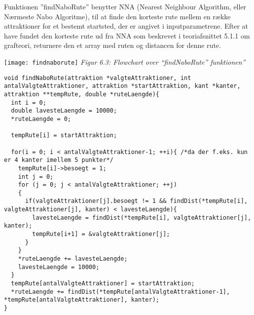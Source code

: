 Funktionen ”findNaboRute” benytter NNA (Nearest Neighbour Algorithm, eller Nærmeste Nabo Algoritme), til at finde den korteste rute mellem en række attraktioner for et bestemt startsted, der er angivet i inputparametrene. Efter at have fundet den korteste rute ud fra NNA som beskrevet i teoriafsnittet 5.1.1 om grafteori, returnere den et array med ruten og distancen for denne rute. \newline
\begin{flushleft}
	\texttt{[image: findnaborute]}\newline
	\textit{Figur 6.3: Flowchart over “findNaboRute” funktionen”}
\end{flushleft}
\begin{lstlisting}
void findNaboRute(attraktion *valgteAttraktioner, int antalValgteAttraktioner, attraktion *startAttraktion, kant *kanter, attraktion **tempRute, double *ruteLaengde){
  int i = 0;
  double lavesteLaengde = 10000;
  *ruteLaengde = 0;

  tempRute[i] = startAttraktion;

  for(i = 0; i < antalValgteAttraktioner-1; ++i){ /*da der f.eks. kun er 4 kanter imellem 5 punkter*/
    tempRute[i]->besoegt = 1;
    int j = 0;
    for (j = 0; j < antalValgteAttraktioner; ++j)
    {
      if(valgteAttraktioner[j].besoegt != 1 && findDist(*tempRute[i], valgteAttraktioner[j], kanter) < lavesteLaengde){
        lavesteLaengde = findDist(*tempRute[i], valgteAttraktioner[j], kanter);
        tempRute[i+1] = &valgteAttraktioner[j];
      }
    }
    *ruteLaengde += lavesteLaengde;
    lavesteLaengde = 10000;
  }
  tempRute[antalValgteAttraktioner] = startAttraktion;
  *ruteLaengde += findDist(*tempRute[antalValgteAttraktioner-1], *tempRute[antalValgteAttraktioner], kanter);
}
\end{lstlisting}


